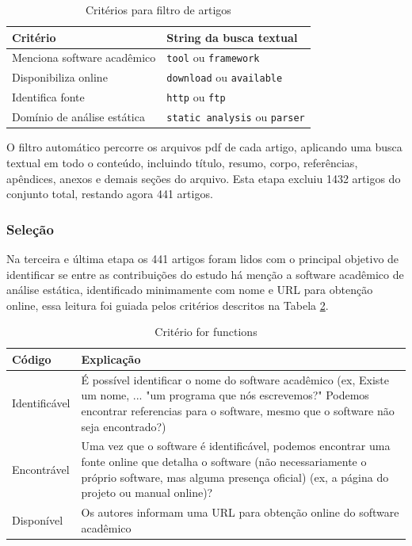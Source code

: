 \begin{table}[h]
\caption{Critérios para filtro de artigos}
\centering
\begin{tabular}{ l l }
  \hline
  Critério                        & String da busca textual               \\
  \hline
  Menciona software acadêmico     & {\tt tool} ou {\tt framework}         \\
  Disponibiliza online            & {\tt download} ou {\tt available}     \\
  Identifica fonte                & {\tt http} ou {\tt ftp}               \\
  Domínio de análise estática     & {\tt static analysis} ou {\tt parser} \\
  \hline
\end{tabular}
\label{codes-for-filter}
\end{table}

O filtro automático percorre os arquivos pdf de cada artigo, aplicando uma
busca textual em todo o conteúdo, incluindo título, resumo, corpo, referências,
apêndices, anexos e demais seções do arquivo. Esta etapa excluiu 1432 artigos
do conjunto total, restando agora 441 artigos.

\subsubsection{Seleção}

Na terceira e última etapa os 441 artigos foram lidos com o principal objetivo
de identificar se entre as contribuições do estudo há menção a software
acadêmico de análise estática, identificado minimamente com nome e URL para
obtenção online, essa leitura foi guiada pelos critérios descritos na Tabela \ref{codes-for-selecao}.

\begin{table}[h]
\caption{Critério for functions \cite{howison2016software}}
\centering
\begin{tabular}{ l p{12cm} }
  \hline
  Código           & Explicação \\
  \hline
  Identificável    & É possível identificar o nome do software acadêmico (ex, Existe um nome, ... "um programa que nós escrevemos?" Podemos encontrar referencias para o software, mesmo que o software não seja encontrado?) \\
  Encontrável      & Uma vez que o software é identificável, podemos encontrar uma fonte online que detalha o software (não necessariamente o próprio software, mas alguma presença oficial) (ex, a página do projeto ou manual online)? \\
  Disponível       & Os autores informam uma URL para obtenção online do software acadêmico \\
  \hline
\end{tabular}
\label{codes-for-selecao}
\end{table}

